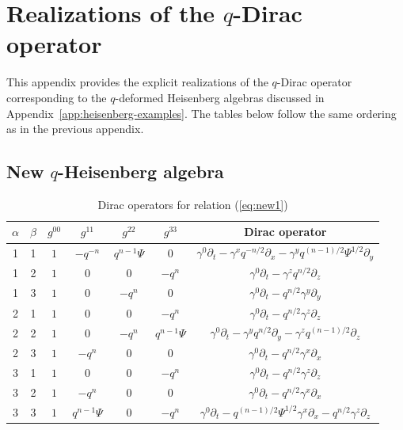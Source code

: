 \documentclass[12pt,a4paper]{article}
\theoremstyle{plain}
\theoremstyle{definition}
\begin{document}
\section{Realizations of the $q$-Dirac operator}
\label{app:dirac-realizations}

This appendix provides the explicit realizations of the $q$-Dirac operator corresponding to the $q$-deformed Heisenberg algebras discussed in Appendix~\ref{app:heisenberg-examples}. The tables below follow the same ordering as in the previous appendix.

\subsection{New $q$-Heisenberg algebra}

\begin{table}[H]
\centering
\small
\caption{Dirac operators for relation (\ref{eq:new1})}
\label{tab:app-dirac-new1}
\begin{tabular}{|c|c|c|c|c|c|c|}
\hline
$\alpha$ & $\beta$ & $g^{00}$ & $g^{11}$ & $g^{22}$ & $g^{33}$ & Dirac operator \\
\hline
1 & 1 & $1$ & $-q^{-n}$ & $q^{n-1}\Psi$ & $0$ & $\gamma^{0}\partial_t - \gamma^{x} q^{-n/2}\partial_x - \gamma^{y} q^{(n-1)/2}\Psi^{1/2}\partial_y$ \\
\hline
1 & 2 & $1$ & $0$ & $0$ & $-q^{n}$ & $\gamma^{0}\partial_t - \gamma^{z} q^{n/2}\partial_z$ \\
\hline
1 & 3 & $1$ & $0$ & $-q^{n}$ & $0$ & $\gamma^{0}\partial_t - q^{n/2}\gamma^{y}\partial_y$ \\
\hline
2 & 1 & $1$ & $0$ & $0$ & $-q^{n}$ & $\gamma^{0}\partial_t - q^{n/2}\gamma^{z}\partial_z$ \\
\hline
2 & 2 & $1$ & $0$ & $-q^{n}$ & $q^{n-1}\Psi$ & $\gamma^{0}\partial_t - \gamma^{y} q^{n/2}\partial_y - \gamma^{z} q^{(n-1)/2}\partial_z$ \\
\hline
2 & 3 & $1$ & $-q^{n}$ & $0$ & $0$ & $\gamma^{0}\partial_t - q^{n/2}\gamma^{x}\partial_x$ \\
\hline
3 & 1 & $1$ & $0$ & $0$ & $-q^{n}$ & $\gamma^{0}\partial_t - q^{n/2}\gamma^{z}\partial_z$ \\
\hline
3 & 2 & $1$ & $-q^{n}$ & $0$ & $0$ & $\gamma^{0}\partial_t - q^{n/2}\gamma^{x}\partial_x$ \\
\hline
3 & 3 & $1$ & $q^{n-1}\Psi$ & $0$ & $-q^{n}$ & $\gamma^{0}\partial_t - q^{(n-1)/2}\Psi^{1/2}\gamma^{x}\partial_x - q^{n/2}\gamma^{z}\partial_z$ \\
\hline
\end{tabular}
\end{table}
\end{document}
